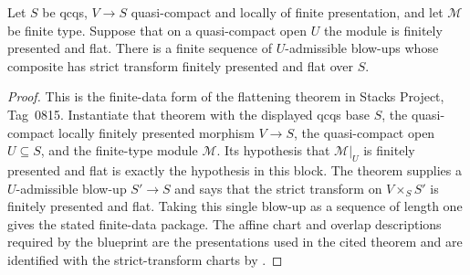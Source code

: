\begin{lemma}
  \label{lemma:nagata-finite-data-flattening-package}

  Let $S$ be qcqs, $V\to S$ quasi-compact and locally of finite
  presentation, and let $\mathcal M$ be finite type.  Suppose that on a
  quasi-compact open $U$ the module is finitely presented and flat.  There
  is a finite sequence of $U$-admissible blow-ups whose composite has strict
  transform finitely presented and flat over $S$.
\end{lemma}

\begin{proof}
  This is the finite-data form of the flattening theorem in Stacks Project,
  Tag~0815.  Instantiate that theorem with the displayed qcqs base $S$, the
  quasi-compact locally finitely presented morphism $V\to S$, the
  quasi-compact open $U\subseteq S$, and the finite-type module
  $\mathcal M$.  Its hypothesis that $\mathcal M|_U$ is finitely presented and
  flat is exactly the hypothesis in this block.  The theorem supplies a
  $U$-admissible blow-up $S'\to S$ and says that the strict transform on
  $V\times_SS'$ is finitely presented and flat.  Taking this single blow-up as
  a sequence of length one gives the stated finite-data package.  The affine
  chart and overlap descriptions required by the blueprint are the
  presentations used in the cited theorem and are identified with the
  strict-transform charts by
  .
\end{proof}

